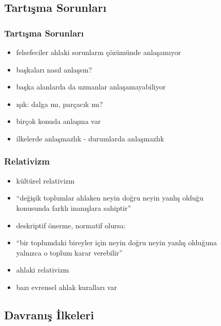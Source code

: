 \documentclass[dvipsnames]{beamer}
\theoremstyle{plain}
\begin{document}
\subsection{Tartışma Sorunları}

\begin{frame}
  \frametitle{Tartışma Sorunları}

  \begin{itemize}
    \item felsefeciler ahlaki sorunların çözümünde anlaşamıyor
    \item başkaları nasıl anlaşsın?

    \pause
    \bigskip
    \item başka alanlarda da uzmanlar anlaşamayabiliyor
    \item ışık: dalga mı, parçacık mı?

    \pause
    \medskip
    \item birçok konuda anlaşma var

    \pause
    \medskip
    \item ilkelerde anlaşmazlık - durumlarda anlaşmazlık
  \end{itemize}
\end{frame}

\begin{frame}
  \frametitle{Relativizm}

  \begin{itemize}
    \item kültürel relativizm
    \item ``değişik toplumlar ahlaken neyin doğru neyin yanlış olduğu\\
      konusunda farklı inanışlara sahiptir''

    \pause
    \medskip
    \item deskriptif önerme, normatif olursa:
    \item ``bir toplumdaki bireyler için neyin doğru neyin yanlış olduğuna\\
      yalnızca o toplum karar verebilir''
    \item ahlaki relativizm

    \pause
    \medskip
    \item bazı evrensel ahlak kuralları var
  \end{itemize}
\end{frame}

\subsection{Davranış İlkeleri}
\end{document}
